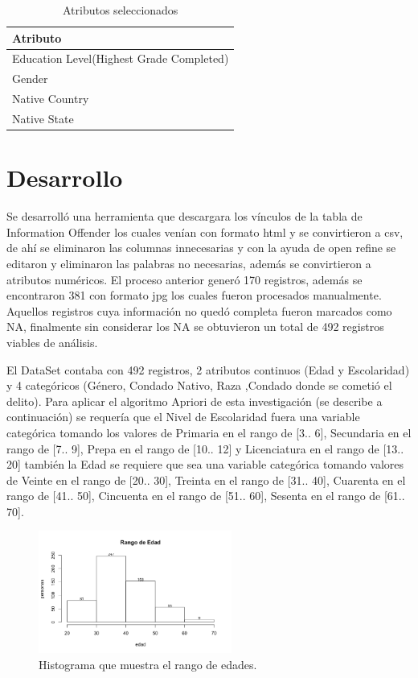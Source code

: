 \documentclass[sigconf]{acmart}
\begin{document}
\begin{table}[!hbt]
\begin{center}
\begin{tabular}{|l|}
\hline
Atributo\\
\hline
Education Level(Highest Grade Completed)\\
Gender\\
Native Country\\
Native State\\
\hline
\end{tabular}
\caption{Atributos seleccionados}
\end{center}
\end{table}


\section{Desarrollo}
Se desarrolló una herramienta que descargara los vínculos de la tabla de Information Offender los cuales venían con formato html y se convirtieron a csv, de ahí se eliminaron las columnas innecesarias y con la ayuda de open refine se editaron y eliminaron las palabras no necesarias, además se convirtieron a atributos numéricos. El proceso anterior generó 170 registros, además se encontraron 381 con formato jpg los cuales fueron procesados manualmente.
Aquellos registros cuya información no quedó completa fueron marcados como NA, finalmente sin considerar los NA se obtuvieron un total de 492 registros viables de análisis.


El DataSet contaba con 492 registros, 2 atributos continuos (Edad y Escolaridad) y 4 categóricos (Género, Condado Nativo, Raza ,Condado donde se cometió el delito). Para aplicar el algoritmo Apriori de esta investigación (se describe a continuación) se requería que el Nivel de Escolaridad fuera una variable categórica tomando los valores de Primaria en el rango de [3.. 6], Secundaria en el rango de  [7.. 9], Prepa en el rango de  [10.. 12] y Licenciatura en el rango de  [13.. 20] también la Edad se requiere que sea una variable categórica tomando valores de Veinte en el rango de [20.. 30], Treinta en el rango de [31.. 40], Cuarenta en el rango de [41.. 50], Cincuenta en el rango de [51.. 60], Sesenta en el rango de [61.. 70].


\begin{figure}[ht]
  \centering
  \includegraphics[width=2.5in]{Rplot.png}
  \caption{Histograma que muestra el rango de edades.}
  \label{fig:rangoEdad}
\end{figure}
\end{document}
